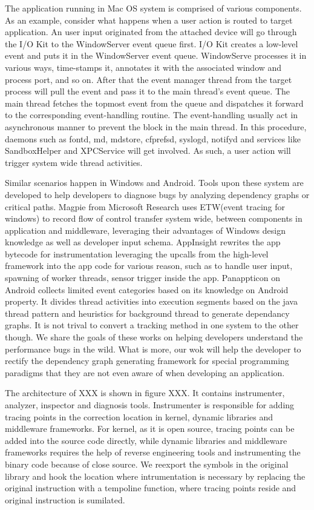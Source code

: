 The application running in Mac OS system is comprised of various components.
As an example, consider what happens when a user action is routed to target application.
An user input originated from the attached device will go through the I/O Kit to the WindowServer event queue first.
I/O Kit creates a low-level event and puts it in the WindowServer event queue.
WindowServe processes it in various ways, time-stamps it, annotates it with the associated window and process port, and so on.
After that the event manager thread from the target process will pull the event and pass it to the main thread's event queue.
The main thread fetches the topmost event from the queue and dispatches it forward to the corresponding event-handling routine. 
The event-handling usually act in asynchronous manner to prevent the block in the main thread.
In this procedure, daemons such as fontd, md, mdstore, cfprefsd, syslogd, notifyd and services like SandboxHelper and XPCService will get involved.
As such, a user action will trigger system wide thread activities.
\par
Similar scenarios happen in Windows and Android.
Tools upon these system are developed to help developers to diagnose bugs by analyzing dependency graphs or critical paths.
Magpie from Microsoft Research uses ETW(event tracing for windows) to record flow of control transfer system wide, between components in application and middleware, leveraging their advantages of Windows design knowledge as well as developer input schema.
AppInsight rewrites the app bytecode for instrumentation leveraging the upcalls from the high-level framework into the app code for various reason, such as to handle user input, spawning of worker threads, sensor trigger inside the app.
Panappticon on Android collects limited event categories based on its knowledge on Android property. It divides thread activities into execution segments based on the java thread pattern and heuristics for background thread to generate dependancy graphs.
It is not trival to convert a tracking method in one system to the other though.
We share the goals of these works on helping developers understand the performance bugs in the wild.
What is more, our wok will help the developer to rectify the dependency graph generating framework for special programming paradigms that they are not even aware of when developing an application. 
\par
The architecture of XXX is shown in figure XXX.
It contains instrumenter, analyzer, inspector and diagnosis tools.
Instrumenter is responsible for adding tracing points in the correction location in kernel, dynamic libraries and middleware frameworks.
For kernel, as it is open source, tracing points can be added into the source code directly,
while dynamic libraries and middleware frameworks requires the help of reverse engineering tools and instrumenting the binary code because of close source.
We reexport the symbols in the original library and hook the location where intrumentation is necessary by replacing the original instruction with a tempoline function, where tracing points reside and original instruction is sumilated.

